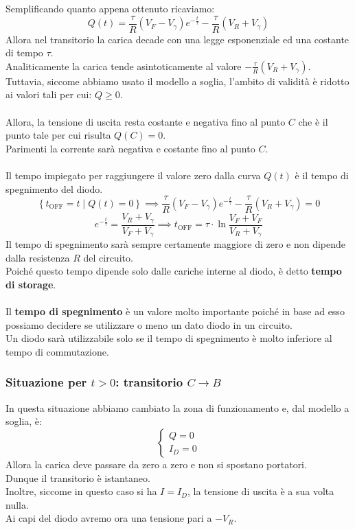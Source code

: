 \documentclass[../main.tex]{subfiles}
\begin{document}
	Semplificando quanto appena ottenuto ricaviamo:
	$$Q(t) = \frac{\tau}{R} (V_F - V_\gamma) e^{-\frac{t}{\tau}} - \frac{\tau}{R} (V_R + V_\gamma)$$
	Allora nel transitorio la carica decade con una legge esponenziale ed una costante di tempo $\tau$. \\
	Analiticamente la carica tende asintoticamente al valore $-\frac{\tau}{R} (V_R + V_\gamma)$. \\
	Tuttavia, siccome abbiamo usato il modello a soglia, l’ambito di validità è ridotto ai valori tali per cui: $Q \geq 0$.\\\\
	Allora, la tensione di uscita resta costante e negativa fino al punto $C$ che è il punto tale per cui risulta $Q(C) = 0$. \\
	Parimenti la corrente sarà negativa e costante fino al punto $C$.\\\\
	Il tempo impiegato per raggiungere il valore zero dalla curva $Q(t)$ è il tempo di spegnimento del diodo.
	$$\left\{t_{\text{OFF}} = t \mid Q(t) = 0\right\} \implies \frac{\tau}{R} (V_F - V_\gamma) e^{-\frac{t}{\tau}} - \frac{\tau}{R} (V_R + V_\gamma) = 0$$ $$e^{-\frac{t}{\tau}} = \frac{V_R + V_\gamma}{V_F + V_\gamma} \implies t_{\text{OFF}} = \tau \cdot \ln \frac{V_F + V_F}{V_R + V_\gamma}$$
	Il tempo di spegnimento sarà sempre certamente maggiore di zero e non dipende dalla resistenza $R$ del circuito. \\
	Poiché questo tempo dipende solo dalle cariche interne al diodo, è detto \textbf{tempo di storage}.\\\\
	Il \textbf{tempo di spegnimento} è un valore molto importante poiché in base ad esso possiamo decidere se utilizzare o meno un dato diodo in un circuito.\\
	Un diodo sarà utilizzabile solo se il tempo di spegnimento è molto inferiore al tempo di commutazione.
	\subsubsection{Situazione per $t > 0$: transitorio $C \rightarrow B$}
	In questa situazione abbiamo cambiato la zona di funzionamento e, dal modello a soglia, è:
	$$\begin{cases} Q = 0 \\ I_D = 0 \end{cases}$$
	Allora la carica deve passare da zero a zero e non si spostano portatori. \\
	Dunque il transitorio è istantaneo. \\
	Inoltre, siccome in questo caso si ha $I = I_D$, la tensione di uscita è a sua volta nulla. \\
	Ai capi del diodo avremo ora una tensione pari a $-V_R$.
\end{document}

